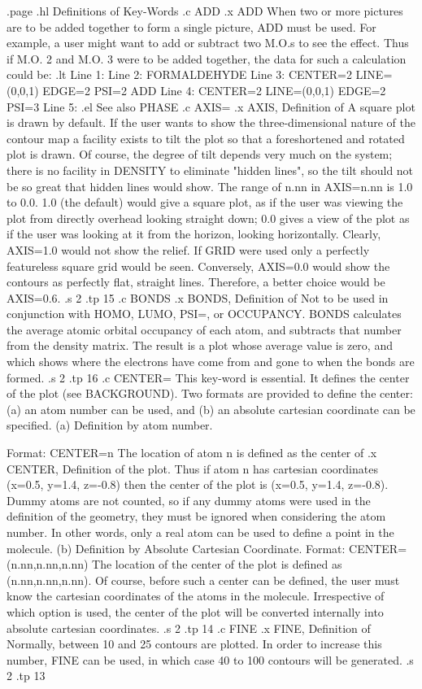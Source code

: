 .page
.hl Definitions of Key-Words
.c
 ADD
.x ADD
 When two or more pictures are to be added together to form a single picture,
ADD must be used. For example, a user might want to add or subtract
two M.O.s to see the effect. Thus if M.O. 2 and M.O. 3 were to be
added together, the data for such a calculation could be:
.lt
Line 1:
Line 2:   FORMALDEHYDE
Line 3: CENTER=2 LINE=(0,0,1) EDGE=2 PSI=2 ADD
Line 4: CENTER=2 LINE=(0,0,1) EDGE=2 PSI=3 
Line 5:
.el
 See also PHASE
.c
 AXIS=
.x AXIS, Definition of
 A square plot is drawn by default. If the user wants to show the
three-dimensional nature of the contour map a facility exists to
tilt the plot so that a foreshortened and rotated plot is drawn.
 Of course, the degree of tilt depends very much on the system;
there is no facility in DENSITY to eliminate "hidden lines", so
the tilt should not be so great that hidden lines would show.
 The range of n.nn in  AXIS=n.nn is 1.0 to 0.0. 1.0 (the default)
would give
a square plot, as if the user was viewing the plot from directly
overhead looking straight down; 0.0 gives a view of the plot as if the
user was looking at it from the horizon, looking horizontally.
 Clearly, AXIS=1.0 would not show the relief. If GRID were
used only a perfectly featureless square grid would be seen.
Conversely, AXIS=0.0 would show the contours as
perfectly flat, straight lines. Therefore, a better choice would
be AXIS=0.6.
.s 2
.tp 15
.c
 BONDS
.x BONDS, Definition of
 Not to be used in conjunction with HOMO, LUMO, PSI=, or OCCUPANCY.
 BONDS calculates the average atomic orbital occupancy of each atom, 
and subtracts that number from the density matrix. The result is a plot
whose average value is zero, and which shows where the electrons have come from and
gone to when the bonds are formed. 
.s 2
.tp 16
.c
 CENTER=
This key-word is essential. It defines the center of the plot (see BACKGROUND).
Two formats are provided to define the center:
(a) an atom number can be used, and (b) an absolute cartesian coordinate 
can be specified.
 (a) Definition by atom number.

 Format: CENTER=n  The location of atom n is defined as the center of 
.x CENTER, Definition of
the plot. Thus if atom
n has cartesian coordinates (x=0.5, y=1.4, z=-0.8) then the center of the
plot is (x=0.5, y=1.4, z=-0.8). Dummy atoms are not counted, so if
any dummy atoms were used in the definition of the geometry, they must
be ignored when considering the atom number. In other words, only a real
atom can be used to define a point in the molecule.
 (b) Definition by Absolute Cartesian Coordinate.
 Format: CENTER=(n.nn,n.nn,n.nn) The location of the center of the plot
is defined as (n.nn,n.nn,n.nn). Of course, before such a center can
be defined, the user must know the cartesian coordinates of the atoms in
the molecule.
 Irrespective of which option is used, the center of the plot will be
converted internally into absolute cartesian coordinates.
.s 2
.tp 14
.c
 FINE
.x FINE, Definition of
 Normally, between 10 and 25 contours are plotted. In order to increase
this number, FINE can be used, in which case 40 to 100 contours
will be generated.
.s 2
.tp 13

